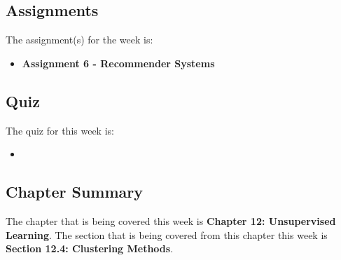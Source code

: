 \subsection{Assignments}

The assignment(s) for the week is:

\begin{itemize}
    \item \textbf{Assignment 6 - Recommender Systems}
\end{itemize}

\subsection{Quiz}

The quiz for this week is:

\begin{itemize}
    \item {}
\end{itemize}

\newpage

\subsection{Chapter Summary}

The chapter that is being covered this week is \textbf{Chapter 12: Unsupervised Learning}. The section that is being covered from this chapter this week is \textbf{Section 12.4: Clustering Methods}.

